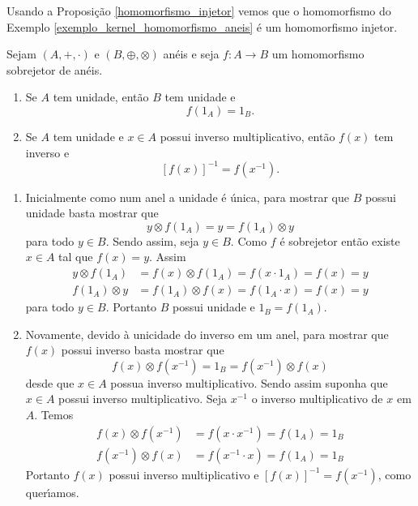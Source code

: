 Usando a Proposição \ref{homomorfismo_injetor} vemos que o homomorfismo do Exemplo \ref{exemplo_kernel_homomorfismo_aneis} é um homomorfismo injetor.
\begin{proposicao}
    Sejam $(A, +, \cdot)$ e $(B, \oplus, \otimes)$ an\'eis e seja $f : A \to B$ um homomorfismo sobrejetor de an\'eis.
    \begin{enumerate}[label={\roman*})]
        \item Se $A$ tem unidade, ent\~ao $B$ tem unidade e
        \[
            f(1_A) = 1_B.
        \]
        \item Se $A$ tem unidade e $x \in A$ possui inverso multiplicativo, ent\~ao $f(x)$ tem inverso e
        \[
            [f(x)]^{-1} = f(x^{-1}).
        \]
    \end{enumerate}
\end{proposicao}
\begin{prova}
    \begin{enumerate}[label={\roman*})]
        \item Inicialmente como num anel a unidade \'e \'unica, para mostrar que $B$ possui unidade basta mostrar que
        \[
            y\otimes f(1_A) = y = f(1_A)\otimes y
        \]
        para todo $y \in B$. Sendo assim, seja $y \in B$. Como $f$ \'e sobrejetor ent\~ao existe $x \in A$ tal que $f(x) = y$. Assim
        \begin{align*}
            y\otimes f(1_A) &= f(x) \otimes f(1_A) = f(x\cdot 1_A) = f(x) = y\\
            f(1_A)\otimes y &= f(1_A) \otimes f(x) = f(1_A\cdot x) = f(x) = y
        \end{align*}
        para todo $y \in B$. Portanto $B$ possui unidade e $1_B = f(1_A)$.

        \item Novamente, devido \`a unicidade do inverso em um anel, para mostrar que $f(x)$ possui inverso basta mostrar que
        \[
            f(x)\otimes f(x^{-1}) = 1_B = f(x^{-1})\otimes f(x)
        \]
        desde que $x \in A$ possua inverso multiplicativo. Sendo assim suponha que $x \in A$ possui inverso multiplicativo. Seja $x^{-1}$ o inverso multiplicativo de $x$ em $A$.
        Temos
        \begin{align*}
            f(x)\otimes f(x^{-1}) &= f(x\cdot x^{-1}) = f(1_A) = 1_B\\
            f(x^{-1})\otimes f(x) &= f(x^{-1}\cdot x) = f(1_A) = 1_B
        \end{align*}
        Portanto $f(x)$ possui inverso multiplicativo e $[f(x)]^{-1} = f(x^{-1})$, como quer{\'\i}amos.
    \end{enumerate}
\end{prova}

